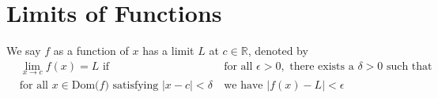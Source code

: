 \section{Limits of Functions} \label{limits_of_functions_section}

\begin{definition}
We say $f$ as a function of $x$ has a limit $L$ at $c \in \mathbb{R}$, denoted by
\begin{align*}
    &\lim_{x \longrightarrow c} f(x) = L \hspace{4pt} \text{if} \hspace{20pt} &&\text{for all} \hspace{4pt} \epsilon > 0, \hspace{4pt} \text{there exists a} \hspace{4pt} \delta > 0 \hspace{4pt} \text{such that}\\[2ex]
    &\text{for all} \hspace{4pt} x \in \text{Dom($f$)} \hspace{4pt} \text{satisfying} \hspace{4pt} \lvert x - c \rvert < \delta &&\text{we have} \hspace{4pt} \lvert f(x) - L \rvert < \epsilon
\end{align*}
\label{definition_limit_of_functions}
\end{definition}

